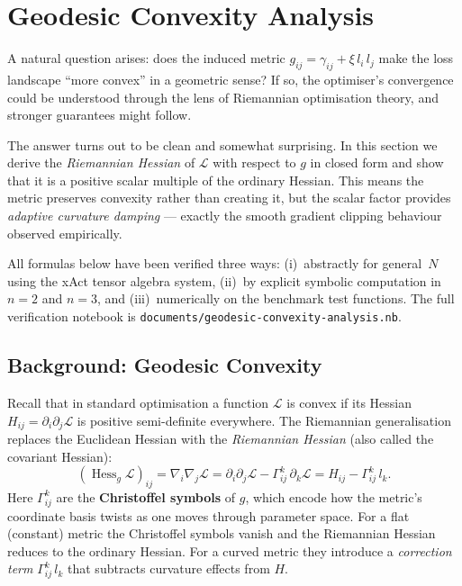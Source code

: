 \documentclass{article}
\newcommand{\loss}{\mathcal{L}}
\begin{document}
\section{Geodesic Convexity Analysis}\label{sec:geodesic}
A natural question arises: does the induced metric
$g_{ij}=\gamma_{ij}+\xi\,l_i\,l_j$ make the loss landscape
``more convex'' in a geometric sense?
If so, the optimiser's convergence could be understood
through the lens of Riemannian optimisation theory,
and stronger guarantees might follow.

The answer turns out to be clean and somewhat surprising.
In this section we derive the \emph{Riemannian Hessian}
of $\loss$ with respect to $g$ in closed form and show that
it is a positive scalar multiple of the ordinary Hessian.
This means the metric preserves convexity rather than creating it,
but the scalar factor provides \emph{adaptive curvature damping} ---
exactly the smooth gradient clipping behaviour observed empirically.

All formulas below have been verified three ways:
(i)~abstractly for general~$N$ using the xAct tensor algebra system,
(ii)~by explicit symbolic computation in $n=2$ and $n=3$, and
(iii)~numerically on the benchmark test functions.
The full verification notebook is
\texttt{documents/geodesic-convexity-analysis.nb}.

\subsection{Background: Geodesic Convexity}\label{sec:geodesic-bg}

Recall that in standard optimisation a function $\loss$ is convex
if its Hessian $H_{ij} = \partial_i\partial_j\loss$ is positive semi-definite
everywhere.
The Riemannian generalisation replaces the Euclidean Hessian
with the \emph{Riemannian Hessian} (also called the covariant Hessian):
\begin{equation}\label{eq:riem-hess-def}
    (\operatorname{Hess}_g\loss)_{ij}
    = \nabla_i\nabla_j\loss
    = \partial_i\partial_j\loss - \Gamma^k_{ij}\,\partial_k\loss
    = H_{ij} - \Gamma^k_{ij}\,l_k.
\end{equation}
Here $\Gamma^k_{ij}$ are the \textbf{Christoffel symbols} of $g$,
which encode how the metric's coordinate basis twists as one moves
through parameter space.
For a flat (constant) metric the Christoffel symbols vanish and
the Riemannian Hessian reduces to the ordinary Hessian.
For a curved metric they introduce a \emph{correction term}
$\Gamma^k_{ij}\,l_k$ that subtracts curvature effects from $H$.
\end{document}

